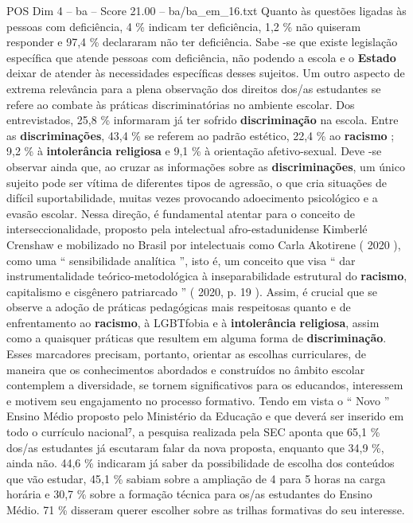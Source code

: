 \begin{textsample}{POS Dim 4 – ba – Score 21.00 – ba/ba\_em\_16.txt}
Quanto às questões ligadas às pessoas com deficiência, 4 \% indicam ter deficiência, 1,2 \% não quiseram responder e 97,4 \% declararam não ter deficiência.
Sabe -se que existe legislação específica que atende pessoas com deficiência, não podendo a escola e o \textbf{Estado} deixar de atender às necessidades específicas desses sujeitos.
Um outro aspecto de extrema relevância para a plena observação dos direitos dos/as estudantes se refere ao combate às práticas discriminatórias no ambiente escolar.
Dos entrevistados, 25,8 \% informaram já ter sofrido \textbf{discriminação} na escola.
Entre as \textbf{discriminações}, 43,4 \% se referem ao padrão estético, 22,4 \% ao \textbf{racismo} ; 9,2 \% à \textbf{intolerância} \textbf{religiosa} e 9,1 \% à orientação afetivo-sexual.
Deve -se observar ainda que, ao cruzar as informações sobre as \textbf{discriminações}, um único sujeito pode ser vítima de diferentes tipos de agressão, o que cria situações de difícil suportabilidade, muitas vezes provocando adoecimento psicológico e a evasão escolar.
Nessa direção, é fundamental atentar para o conceito de interseccionalidade, proposto pela intelectual afro-estadunidense Kimberlé Crenshaw e mobilizado no Brasil por intelectuais como Carla Akotirene ( 2020 ), como uma “ sensibilidade analítica ”, isto é, um conceito que visa “ dar instrumentalidade teórico-metodológica à inseparabilidade estrutural do \textbf{racismo}, capitalismo e cisgênero patriarcado ” ( 2020, p. 19 ).
Assim, é crucial que se observe a adoção de práticas pedagógicas mais respeitosas quanto e de enfrentamento ao \textbf{racismo}, à LGBTfobia e à \textbf{intolerância} \textbf{religiosa}, assim como a quaisquer práticas que resultem em alguma forma de \textbf{discriminação}.
Esses marcadores precisam, portanto, orientar as escolhas curriculares, de maneira que os conhecimentos abordados e construídos no âmbito escolar contemplem a diversidade, se tornem significativos para os educandos, interessem e motivem seu engajamento no processo formativo.
Tendo em vista o “ Novo ” Ensino Médio proposto pelo Ministério da Educação e que deverá ser inserido em todo o currículo nacional⁷, a pesquisa realizada pela SEC aponta que 65,1 \% dos/as estudantes já escutaram falar da nova proposta, enquanto que 34,9 \%, ainda não. 44,6 \% indicaram já saber da possibilidade de escolha dos conteúdos que vão estudar, 45,1 \% sabiam sobre a ampliação de 4 para 5 horas na carga horária e 30,7 \% sobre a formação técnica para os/as estudantes do Ensino Médio. 71 \% disseram querer escolher sobre as trilhas formativas do seu interesse.

\end{textsample}
